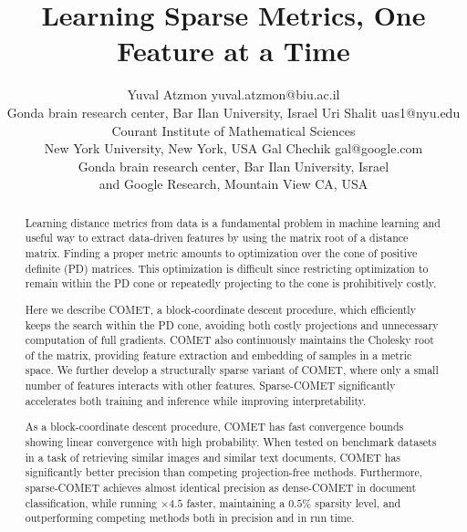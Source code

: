 \documentclass[twoside,11pt]{article}
\begin{document}
\title{Learning Sparse Metrics, One Feature at a Time}


\author{\name Yuval Atzmon \email yuval.atzmon@biu.ac.il \\
       \addr Gonda brain research center, Bar Ilan University, Israel
       \AND
       \name Uri Shalit \email uas1@nyu.edu \\
       \addr Courant Institute of Mathematical Sciences \\
       New York University, New York, USA
       \AND
      \name Gal Chechik \email gal@google.com \\
       \addr Gonda brain research center, Bar Ilan University, Israel \\
       and Google Research, Mountain View CA, USA}

\maketitle
\vskip -15pt
\begin{abstract}%

Learning distance metrics from data is a fundamental problem in machine learning and useful way to extract data-driven features by using the matrix root of a distance matrix. Finding a proper metric amounts to optimization over the cone of positive definite (PD) matrices. This optimization is difficult since restricting optimization to remain within the PD cone or repeatedly projecting to the cone is prohibitively costly.

Here we describe COMET, a block-coordinate descent procedure, which efficiently keeps the search within the PD cone, avoiding both costly projections and unnecessary computation of full gradients. COMET also continuously maintains the Cholesky root of the matrix, providing feature extraction and embedding of samples in a metric space. We further develop a structurally sparse variant of COMET, where only a small number of features interacts with other features. Sparse-COMET significantly accelerates both training and inference while improving interpretability.
 
As a block-coordinate descent procedure, COMET has fast convergence bounds showing linear convergence with high probability. When tested on benchmark datasets in a task of retrieving similar images and similar text documents, COMET has significantly better precision than competing projection-free methods. Furthermore, sparse-COMET achieves almost identical precision as dense-COMET in document classification, while running $\times 4.5$ faster, maintaining a $0.5\%$ sparsity level, and outperforming competing methods both in precision and in run time. 
\end{abstract}
\end{document}
